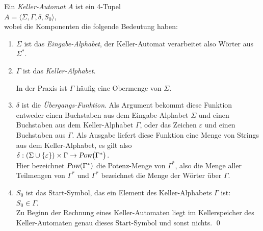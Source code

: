 \begin{Definition}
  Ein \emph{Keller-Automat} $A$ ist ein 4-Tupel
  \\[0.2cm]
  \hspace*{1.3cm}
  $A = \langle \Sigma, \Gamma, \delta, S_0 \rangle$,
  \\[0.2cm]
  wobei die Komponenten die folgende Bedeutung haben:
  \begin{enumerate}
  \item $\Sigma$ ist das \emph{Eingabe-Alphabet}, der Keller-Automat verarbeitet also W\"orter aus
        $\Sigma^*$.
  \item $\Gamma$ ist das \emph{Keller-Alphabet}.

        In der Praxis ist $\Gamma$ h\"aufig eine Obermenge von $\Sigma$.
  \item $\delta$ ist die \emph{\"Ubergangs-Funktion}.  
        Als Argument bekommt diese Funktion entweder einen Buchstaben
        aus dem Eingabe-Alphabet $\Sigma$ und einen Buchstaben aus dem Keller-Alphabet
        $\Gamma$, oder das Zeichen $\varepsilon$ und einen Buchstaben aus $\Gamma$.
        Als Ausgabe liefert diese Funktion eine Menge von Strings aus dem Keller-Alphabet,
        es gilt also
        \\[0.2cm]
        \hspace*{1.3cm}
        $\delta: (\Sigma \cup \{ \varepsilon \}) \times \Gamma \rightarrow \textsl{Pow}\bigl(\Gamma^*\bigr)$.
        \\[0.2cm]
        Hier bezeichnet $\textsl{Pow}(\Gamma^*)$ die Potenz-Menge von $\Gamma^*$, also die
        Menge aller Teilmengen von $\Gamma^*$ und $\Gamma^*$ bezeichnet die Menge der
        W\"orter \"uber $\Gamma$.
  \item $S_0$ ist das Start-Symbol, das ein Element des Keller-Alphabets $\Gamma$ ist:
        \\[0.2cm]
        \hspace*{1.3cm}
        $S_0 \in \Gamma$.
        \\[0.2cm]
        Zu Beginn der Rechnung eines Keller-Automaten liegt im Kellerspeicher des
        Keller-Automaten genau dieses Start-Symbol und sonst nichts.  \qed
  \end{enumerate}
\end{Definition}

